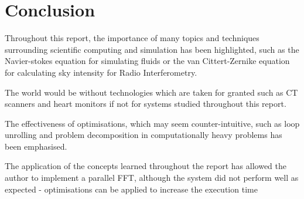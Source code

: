 \chapter{Conclusion}
Throughout this report, the importance of many topics and techniques surrounding scientific computing and simulation has been highlighted, such as the Navier-stokes equation for simulating fluids or  the van Cittert-Zernike equation for calculating sky intensity for Radio Interferometry. 

The world would be without technologies which are taken for granted such as CT scanners and heart monitors if not for systems studied throughout this report.

The effectiveness of optimisations, which may seem counter-intuitive, such as loop unrolling and problem decomposition in computationally heavy problems has been emphasised. 

The application of the concepts learned throughout the report has allowed the author to implement a parallel FFT, although the system did not perform well as expected - optimisations can be applied to increase the execution time 